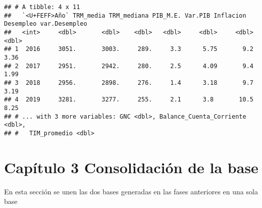 \documentclass[
  11pt,
]{article}
\begin{document}
\begin{verbatim}
## # A tibble: 4 x 11
##   `<U+FEFF>Año` TRM_media TRM_mediana PIB_M.E. Var.PIB Inflacion Desempleo var.Desempleo
##   <int>     <dbl>       <dbl>    <dbl>   <dbl>     <dbl>     <dbl>         <dbl>
## 1  2016     3051.       3003.     289.     3.3      5.75       9.2          3.36
## 2  2017     2951.       2942.     280.     2.5      4.09       9.4          1.99
## 3  2018     2956.       2898.     276.     1.4      3.18       9.7          3.19
## 4  2019     3281.       3277.     255.     2.1      3.8       10.5          8.25
## # ... with 3 more variables: GNC <dbl>, Balance_Cuenta_Corriente <dbl>,
## #   TIM_promedio <dbl>
\end{verbatim}

\hypertarget{capuxedtulo-3-consolidaciuxf3n-de-la-base}{%
\section{Capítulo 3 Consolidación de la
base}\label{capuxedtulo-3-consolidaciuxf3n-de-la-base}}

En esta sección se unen las dos bases generadas en las fases anteriores
en una sola base
\end{document}
